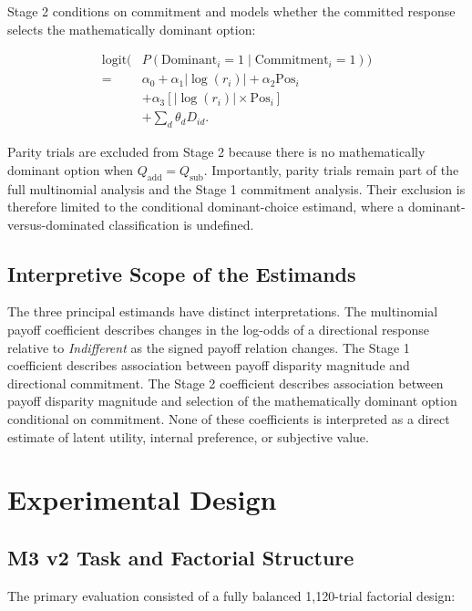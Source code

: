 \documentclass[10pt,journal,compsoc]{IEEEtran}
\begin{document}
Stage 2 conditions on commitment and models whether the committed response selects the mathematically dominant option:

\begin{equation}
\begin{aligned}
\text{logit}\!\Big(
&P(\text{Dominant}_i=1\mid\text{Commitment}_i=1)
\Big) \\
={}& \alpha_0+\alpha_1|\log(r_i)|
+\alpha_2\text{Pos}_i \\
&+\alpha_3[|\log(r_i)|\times\text{Pos}_i] \\
&+\sum_{d}\theta_d D_{id}.
\end{aligned}
\end{equation}

Parity trials are excluded from Stage 2 because there is no mathematically dominant option when $Q_{\mathrm{add}}=Q_{\mathrm{sub}}$. Importantly, parity trials remain part of the full multinomial analysis and the Stage 1 commitment analysis. Their exclusion is therefore limited to the conditional dominant-choice estimand, where a dominant-versus-dominated classification is undefined.

\subsection{Interpretive Scope of the Estimands}
The three principal estimands have distinct interpretations. The multinomial payoff coefficient describes changes in the log-odds of a directional response relative to \textit{Indifferent} as the signed payoff relation changes. The Stage 1 coefficient describes association between payoff disparity magnitude and directional commitment. The Stage 2 coefficient describes association between payoff disparity magnitude and selection of the mathematically dominant option conditional on commitment. None of these coefficients is interpreted as a direct estimate of latent utility, internal preference, or subjective value.

\section{Experimental Design}
\label{sec:methods}

\subsection{M3 v2 Task and Factorial Structure}
The primary evaluation consisted of a fully balanced 1,120-trial factorial design:
\end{document}
